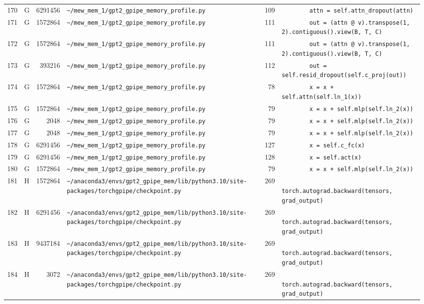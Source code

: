 \documentclass{article}
\begin{document}
\begin{longtable}{r l r p{6.5cm} r p{7.0cm}}
170 & G & 6291456 & \lstinline|~/mew_mem_1/gpt2_gpipe_memory_profile.py| & 109 & \lstinline|        attn = self.attn_dropout(attn)| \\
171 & G & 1572864 & \lstinline|~/mew_mem_1/gpt2_gpipe_memory_profile.py| & 111 & \lstinline|        out = (attn @ v).transpose(1, 2).contiguous().view(B, T, C)| \\
172 & G & 1572864 & \lstinline|~/mew_mem_1/gpt2_gpipe_memory_profile.py| & 111 & \lstinline|        out = (attn @ v).transpose(1, 2).contiguous().view(B, T, C)| \\
173 & G & 393216 & \lstinline|~/mew_mem_1/gpt2_gpipe_memory_profile.py| & 112 & \lstinline|        out = self.resid_dropout(self.c_proj(out))| \\
174 & G & 1572864 & \lstinline|~/mew_mem_1/gpt2_gpipe_memory_profile.py| & 78 & \lstinline|        x = x + self.attn(self.ln_1(x))| \\
175 & G & 1572864 & \lstinline|~/mew_mem_1/gpt2_gpipe_memory_profile.py| & 79 & \lstinline|        x = x + self.mlp(self.ln_2(x))| \\
176 & G & 2048 & \lstinline|~/mew_mem_1/gpt2_gpipe_memory_profile.py| & 79 & \lstinline|        x = x + self.mlp(self.ln_2(x))| \\
177 & G & 2048 & \lstinline|~/mew_mem_1/gpt2_gpipe_memory_profile.py| & 79 & \lstinline|        x = x + self.mlp(self.ln_2(x))| \\
178 & G & 6291456 & \lstinline|~/mew_mem_1/gpt2_gpipe_memory_profile.py| & 127 & \lstinline|        x = self.c_fc(x)| \\
179 & G & 6291456 & \lstinline|~/mew_mem_1/gpt2_gpipe_memory_profile.py| & 128 & \lstinline|        x = self.act(x)| \\
180 & G & 1572864 & \lstinline|~/mew_mem_1/gpt2_gpipe_memory_profile.py| & 79 & \lstinline|        x = x + self.mlp(self.ln_2(x))| \\
181 & H & 1572864 & \lstinline|~/anaconda3/envs/gpt2_gpipe_mem/lib/python3.10/site-packages/torchgpipe/checkpoint.py| & 269 & \lstinline|            torch.autograd.backward(tensors, grad_output)| \\
182 & H & 6291456 & \lstinline|~/anaconda3/envs/gpt2_gpipe_mem/lib/python3.10/site-packages/torchgpipe/checkpoint.py| & 269 & \lstinline|            torch.autograd.backward(tensors, grad_output)| \\
183 & H & 9437184 & \lstinline|~/anaconda3/envs/gpt2_gpipe_mem/lib/python3.10/site-packages/torchgpipe/checkpoint.py| & 269 & \lstinline|            torch.autograd.backward(tensors, grad_output)| \\
184 & H & 3072 & \lstinline|~/anaconda3/envs/gpt2_gpipe_mem/lib/python3.10/site-packages/torchgpipe/checkpoint.py| & 269 & \lstinline|            torch.autograd.backward(tensors, grad_output)| \\
\end{longtable}
\end{document}
